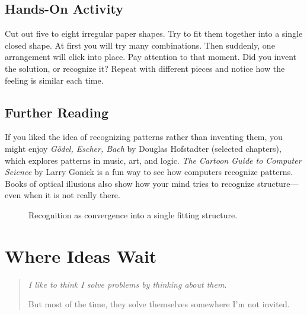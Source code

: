 \documentclass[11pt]{book}
\theoremstyle{definition}
\theoremstyle{remark}
\newenvironment{deepthought}
  {\begin{quote}\itshape}
  {\end{quote}}
\begin{document}
\section*{Hands-On Activity}

Cut out five to eight irregular paper shapes. Try to fit them together
into a single closed shape. At first you will try many combinations.
Then suddenly, one arrangement will click into place. Pay attention to
that moment. Did you invent the solution, or recognize it? Repeat with
different pieces and notice how the feeling is similar each time.

\section*{Further Reading}

If you liked the idea of recognizing patterns rather than inventing them,
you might enjoy \textit{G\"{o}del, Escher, Bach} by Douglas Hofstadter
(selected chapters), which explores patterns in music, art, and logic.
\textit{The Cartoon Guide to Computer Science} by Larry Gonick is a fun
way to see how computers recognize patterns. Books of optical illusions
also show how your mind tries to recognize structure---even when it is
not really there.

\begin{figure}[h]
\centering
{}
\caption{Recognition as convergence into a single fitting structure.}
\end{figure}

\chapter{Where Ideas Wait}

\begin{deepthought}
I like to think I solve problems by thinking about them.

But most of the time, they solve themselves somewhere I'm not invited.
\end{deepthought}
\end{document}
